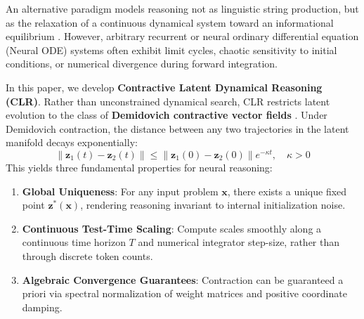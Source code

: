 \documentclass[11pt,a4paper]{article}
\begin{document}
An alternative paradigm models reasoning not as linguistic string production, but as the relaxation of a continuous dynamical system toward an informational equilibrium \citep{bai2019deep, winston2020monotone}. However, arbitrary recurrent or neural ordinary differential equation (Neural ODE) systems \citep{chen2018neural} often exhibit limit cycles, chaotic sensitivity to initial conditions, or numerical divergence during forward integration.

In this paper, we develop \textbf{Contractive Latent Dynamical Reasoning (CLR)}. Rather than unconstrained dynamical search, CLR restricts latent evolution to the class of \textbf{Demidovich contractive vector fields} \citep{demidovich1961dissipativity, lohmiller1998contraction}. Under Demidovich contraction, the distance between any two trajectories in the latent manifold decays exponentially:
\begin{equation}
\|\mathbf{z}_1(t) - \mathbf{z}_2(t)\| \le \|\mathbf{z}_1(0) - \mathbf{z}_2(0)\| e^{-\kappa t}, \quad \kappa > 0
\end{equation}
This yields three fundamental properties for neural reasoning:
\begin{enumerate}
    \item \textbf{Global Uniqueness}: For any input problem $\mathbf{x}$, there exists a unique fixed point $\mathbf{z}^*(\mathbf{x})$, rendering reasoning invariant to internal initialization noise.
    \item \textbf{Continuous Test-Time Scaling}: Compute scales smoothly along a continuous time horizon $T$ and numerical integrator step-size, rather than through discrete token counts.
    \item \textbf{Algebraic Convergence Guarantees}: Contraction can be guaranteed a priori via spectral normalization of weight matrices and positive coordinate damping.
\end{enumerate}
\end{document}
